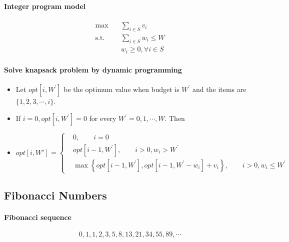                 \paragraph{Integer program model}
                    \begin{align}
                        \max \quad & \sum_{i \in S} v_i\\
                        \text{s.t.} \quad & \sum_{i \in S} w_i \le W\\
                        & w_i \ge 0, \forall i \in S
                    \end{align}

                \paragraph{Solve knapsack problem by dynamic programming}
                    \begin{itemize}
                        \item Let $opt[i, W^\prime]$ be the optimum value when budget is $W^\prime$ and the items are $\{1, 2, 3, \cdots, i\}$.
                        \item If $i = 0, opt[i, W^\prime] = 0$ for every $W^\prime = 0, 1, \cdots, W$. Then
                        \item $opt[i, W'] = \begin{cases}
                            & 0, \qquad i = 0\\
                            & opt[i - 1, W^\prime], \qquad i > 0, w_i > W^\prime \\
                            & \max \left\{ opt[i - 1, W^\prime], opt[i - 1, W^\prime - w_i] + v_i \right\}, \qquad i > 0, w_i \le W^\prime
                        \end{cases}$
                    \end{itemize}
                    
            \subsection{Fibonacci Numbers}
                \paragraph{Fibonacci sequence}
                    \begin{equation}
                        0, 1, 1, 2, 3, 5, 8, 13, 21, 34, 55, 89, \cdots
                    \end{equation}

